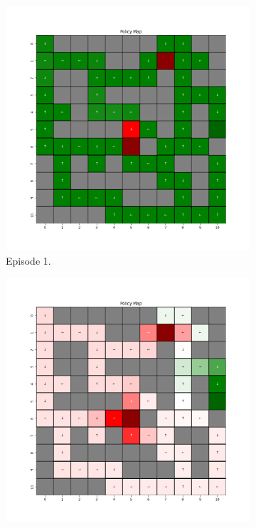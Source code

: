 \documentclass{assignment}
\begin{document}
\begin{figure}[H]
    \begin{subfigure}{0.3\textwidth}
        \includegraphics[width=\textwidth]{figures/policy_td/epsilon_sweep/policy_alpha_0.1_gamma_0.95_epsilon_0.5_iteration_1.png}
    \caption{Episode 1.}
    \end{subfigure}\hfill
    \begin{subfigure}{0.3\textwidth}
        \includegraphics[width=\textwidth]{figures/policy_td/epsilon_sweep/policy_alpha_0.1_gamma_0.95_epsilon_0.5_iteration_50.png}

\end{subfigure}
\end{figure}
\end{document}
